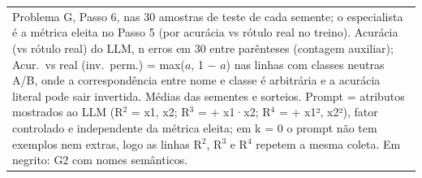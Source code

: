 \begin{table}[htbp]
\begin{tabular}{llllrrrrrrrrrr}
\bottomrule
\multicolumn{14}{p{0.95\linewidth}}{\footnotesize Problema G, Passo 6, nas 30 amostras de teste de cada semente; o especialista é a métrica eleita no Passo 5 (por acurácia vs rótulo real no treino). Acurácia (vs rótulo real) do LLM, n erros em 30 entre parênteses (contagem auxiliar); Acur.\ vs real (inv.\ perm.) = max($a$, 1 $-$ $a$) nas linhas com classes neutras A/B, onde a correspondência entre nome e classe é arbitrária e a acurácia literal pode sair invertida. Médias das sementes e sorteios. Prompt = atributos mostrados ao LLM (R$^2$ = x1, x2; R$^3$ = + x1·x2; R$^4$ = + x1², x2²), fator controlado e independente da métrica eleita; em k = 0 o prompt não tem exemplos nem extras, logo as linhas R$^2$, R$^3$ e R$^4$ repetem a mesma coleta. Em negrito: G2 com nomes semânticos.} \\
\end{tabular}
\end{table}
